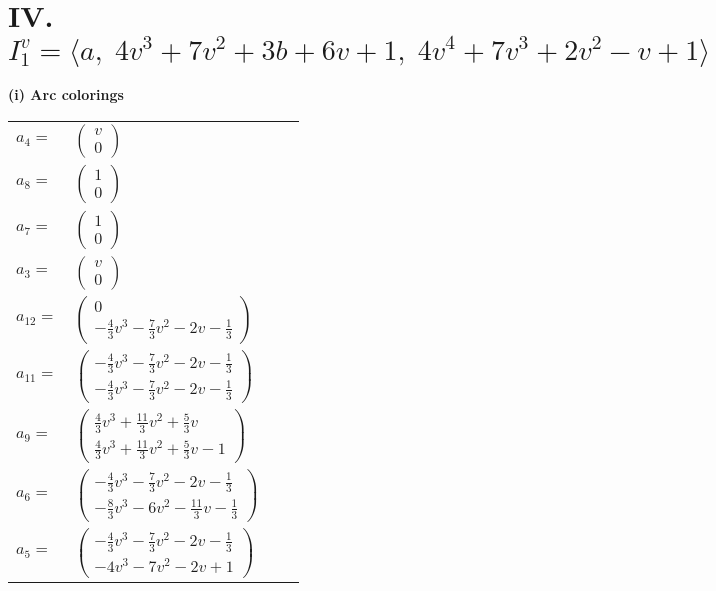 \documentclass[1p]{elsarticle_modified}
\theoremstyle{definition}
\begin{document}
\centering \section*{IV. $I^v_{1}= \langle a,\;4 v^3+7 v^2+3 b+6 v+1,\;4 v^4+7 v^3+2 v^2- v+1 \rangle$}
\flushleft \textbf{(i) Arc colorings}\\
\begin{tabular}{m{7pt} m{180pt} m{7pt} m{180pt} }
\flushright $a_{4}=$&$\begin{pmatrix}v\\0\end{pmatrix}$ \\
\flushright $a_{8}=$&$\begin{pmatrix}1\\0\end{pmatrix}$ \\
\flushright $a_{7}=$&$\begin{pmatrix}1\\0\end{pmatrix}$ \\
\flushright $a_{3}=$&$\begin{pmatrix}v\\0\end{pmatrix}$ \\
\flushright $a_{12}=$&$\begin{pmatrix}0\\-\frac{4}{3} v^3-\frac{7}{3} v^2-2 v-\frac{1}{3}\end{pmatrix}$ \\
\flushright $a_{11}=$&$\begin{pmatrix}-\frac{4}{3} v^3-\frac{7}{3} v^2-2 v-\frac{1}{3}\\-\frac{4}{3} v^3-\frac{7}{3} v^2-2 v-\frac{1}{3}\end{pmatrix}$ \\
\flushright $a_{9}=$&$\begin{pmatrix}\frac{4}{3} v^3+\frac{11}{3} v^2+\frac{5}{3} v\\\frac{4}{3} v^3+\frac{11}{3} v^2+\frac{5}{3} v-1\end{pmatrix}$ \\
\flushright $a_{6}=$&$\begin{pmatrix}-\frac{4}{3} v^3-\frac{7}{3} v^2-2 v-\frac{1}{3}\\-\frac{8}{3} v^3-6 v^2-\frac{11}{3} v-\frac{1}{3}\end{pmatrix}$ \\
\flushright $a_{5}=$&$\begin{pmatrix}-\frac{4}{3} v^3-\frac{7}{3} v^2-2 v-\frac{1}{3}\\-4 v^3-7 v^2-2 v+1\end{pmatrix}$ \\

\end{tabular}
\end{document}
